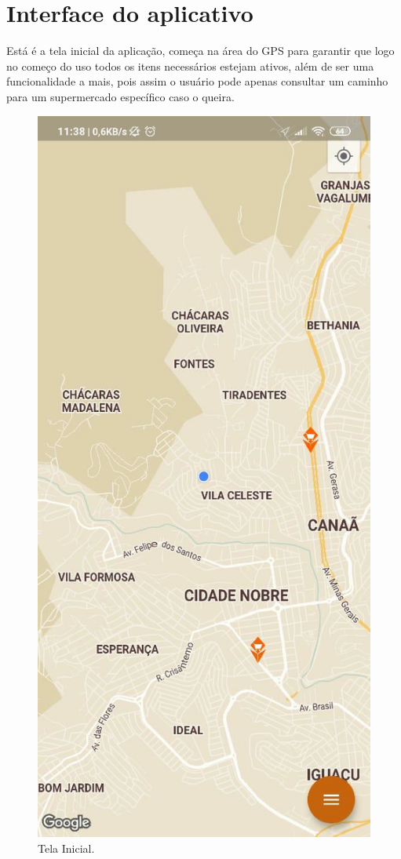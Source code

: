 \section{Interface do aplicativo}
Está é a tela inicial da aplicação, começa na área do GPS para garantir que logo no começo do uso todos os itens necessários estejam ativos, além de ser uma funcionalidade a mais, pois assim o usuário pode apenas consultar um caminho para um supermercado específico caso o queira.
\begin{figure}[H]
    \centering
    \caption{Tela Inicial.}
    \includegraphics[scale=0.3]{Imagens/Print01.png}
\end{figure}

